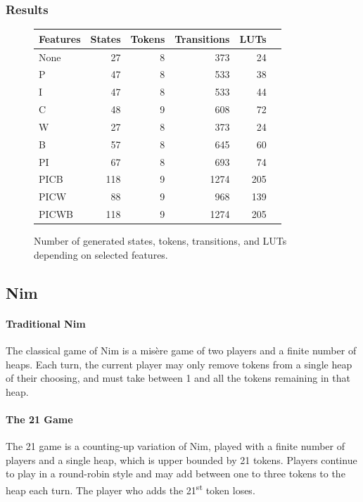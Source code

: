 \documentclass[sigplan,anonymous,review]{acmart}
\begin{document}
\subsubsection{Results}
\begin{figure}
    \centering
    \begin{tabular}{lrrrrr}\toprule
Features &States &Tokens &Transitions &LUTs \\\midrule
None &27 &8 &373 &24 \\
P &47 &8 &533 &38 \\
I &47 &8 &533 &44 \\
C &48 &9 &608 &72 \\
W &27 &8 &373 &24 \\
B &57 &8 &645 &60 \\
PI &67 &8 &693 &74 \\
PICB &118 &9 &1274 &205 \\
PICW &88 &9 &968 &139 \\
PICWB &118 &9 &1274 &205 \\
\bottomrule
\end{tabular}
    \caption{Number of generated states, tokens, transitions, and LUTs depending on selected features.}
    \label{fig:vmData}
\end{figure}       


\subsection{Nim}\label{sec:nim}
\paragraph{Traditional Nim}
The classical game of Nim is a mis\`{e}re game of two players and a finite number of heaps. Each turn, the current player may only remove tokens from a single heap of their choosing, and must take between 1 and all the tokens remaining in that heap. 

\paragraph{The 21 Game}
The 21 game is a counting-up variation of Nim, played with a finite number of players and a single heap, which is upper bounded by 21 tokens. Players continue to play in a round-robin style and may add between one to three tokens to the heap each turn. The player who adds the 21\textsuperscript{st} token loses. 
\end{document}
